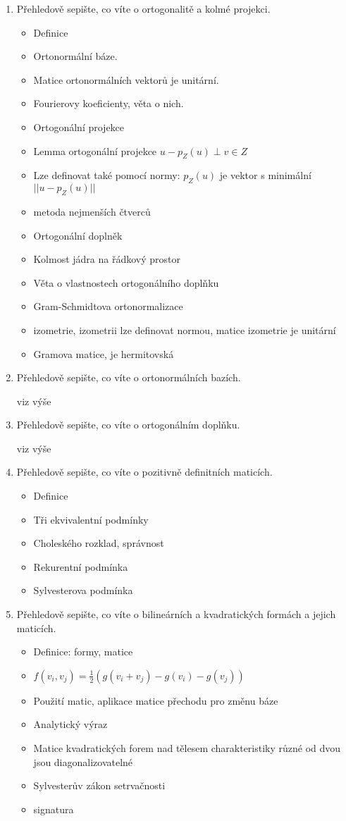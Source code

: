 \documentclass[10pt,a4paper]{article}
\theoremstyle{plain}
\begin{document}
\begin{enumerate}
\item Přehledově sepište, co víte o ortogonalitě a kolmé projekci.
\begin{itemize}
\item Definice
\item Ortonormální báze. 
\item Matice ortonormálních vektorů je unitární.
\item Fourierovy koeficienty, věta o nich.
\item Ortogonální projekce
\item Lemma ortogonální projekce $u - p_Z(u) \perp v \in Z$
\item Lze definovat také pomocí normy: $p_Z(u)$ je vektor s minimální $||u - p_Z(u)||$
\item metoda nejmenších čtverců
\item Ortogonální doplněk
\item Kolmost jádra na řádkový prostor
\item Věta o vlastnostech ortogonálního doplňku
\item Gram-Schmidtova ortonormalizace
\item izometrie, izometrii lze definovat normou, matice izometrie je unitární
\item Gramova matice, je hermitovská
\end{itemize}


\item Přehledově sepište, co víte o ortonormálních bazích.

viz výše

\item Přehledově sepište, co víte o ortogonálním doplňku.

viz výše

\item Přehledově sepište, co víte o pozitivně definitních maticích.

\begin{itemize}
\item Definice
\item Tři ekvivalentní podmínky
\item Choleského rozklad, správnost
\item Rekurentní podmínka
\item Sylvesterova podmínka
\end{itemize}


\item Přehledově sepište, co víte o bilineárních a kvadratických formách a jejich maticích.
\begin{itemize}
\item Definice: formy, matice
\item $f(v_i, v_j) = \frac12 (g(v_i + v_j) - g(v_i) - g(v_j))$
\item Použití matic, aplikace matice přechodu pro změnu báze
\item Analytický výraz
\item Matice kvadratických forem nad tělesem charakteristiky různé od dvou jsou diagonalizovatelné
\item Sylvesterův zákon setrvačnosti
\item signatura
\end{itemize}
\end{enumerate}
\end{document}
